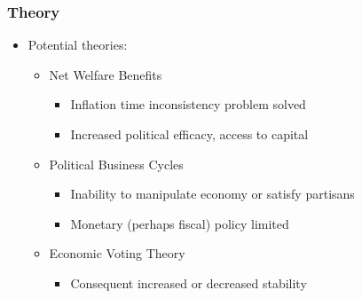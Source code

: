\documentclass{beamer}
\begin{document}
    \begin{frame}
        \frametitle{Theory}
        \begin{itemize}
            \item Potential theories:
            \begin{itemize}
                \item Net Welfare Benefits
                \begin{itemize}
                    \item Inflation time inconsistency problem solved
                    \item Increased political efficacy, access to capital
                \end{itemize}
                \item Political Business Cycles
                \begin{itemize}
                    \item Inability to manipulate economy or satisfy partisans
                    \item Monetary (perhaps fiscal) policy limited
                \end{itemize}
                \item Economic Voting Theory
                \begin{itemize}
                    \item Consequent increased or decreased stability
                \end{itemize}
            \end{itemize}
        \end{itemize}

        \begin{figure}[h]
    

\end{figure}
\end{frame}
\end{document}
